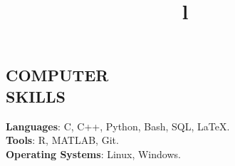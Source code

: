 \documentclass[margin]{res}
\begin{document}
\begin{resume}

\section{COMPUTER\\SKILLS}
\textbf{Languages}: C, C++, Python,  Bash, SQL, \LaTeX.
\\
\textbf{Tools}: R, MATLAB, Git.
\\
\textbf{Operating Systems}:  Linux, Windows.

\begin{format}
\title{l}\\
\\
\body\\
\end{format}


\end{resume}
\end{document}
